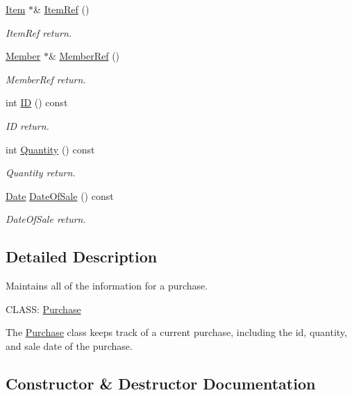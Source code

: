 \begin{DoxyCompactItemize}
\item 
\hyperlink{class_item}{Item} $\ast$\& \hyperlink{class_purchase_ae42cfec377bf8338185d21481654f126}{Item\+Ref} ()
\begin{DoxyCompactList}\small\item\em Item\+Ref return. \end{DoxyCompactList}\item 
\hyperlink{class_member}{Member} $\ast$\& \hyperlink{class_purchase_ac1b9c14867cc21b71cfd8a8a025d64e1}{Member\+Ref} ()
\begin{DoxyCompactList}\small\item\em Member\+Ref return. \end{DoxyCompactList}\item 
int \hyperlink{class_purchase_ac11c5f5772648b8e5a8e1dd370982720}{ID} () const 
\begin{DoxyCompactList}\small\item\em ID return. \end{DoxyCompactList}\item 
int \hyperlink{class_purchase_af8915f2329cb353968562a2ccaf9e0df}{Quantity} () const 
\begin{DoxyCompactList}\small\item\em Quantity return. \end{DoxyCompactList}\item 
\hyperlink{class_date}{Date} \hyperlink{class_purchase_ac69d08647056818ff0fc61dec674461f}{Date\+Of\+Sale} () const 
\begin{DoxyCompactList}\small\item\em Date\+Of\+Sale return. \end{DoxyCompactList}\end{DoxyCompactItemize}


\subsection{Detailed Description}
Maintains all of the information for a purchase. 

C\+L\+A\+SS\+: \hyperlink{class_purchase}{Purchase} 

 The \hyperlink{class_purchase}{Purchase} class keeps track of a current purchase, including the id, quantity, and sale date of the purchase. 

\subsection{Constructor \& Destructor Documentation}
